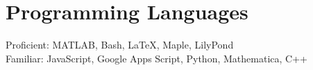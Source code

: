 \section{\sc Programming Languages}
Proficient: MATLAB, Bash, \LaTeX, Maple, LilyPond\\
Familiar: JavaScript, Google Apps Script, Python, Mathematica, C++

\endinput